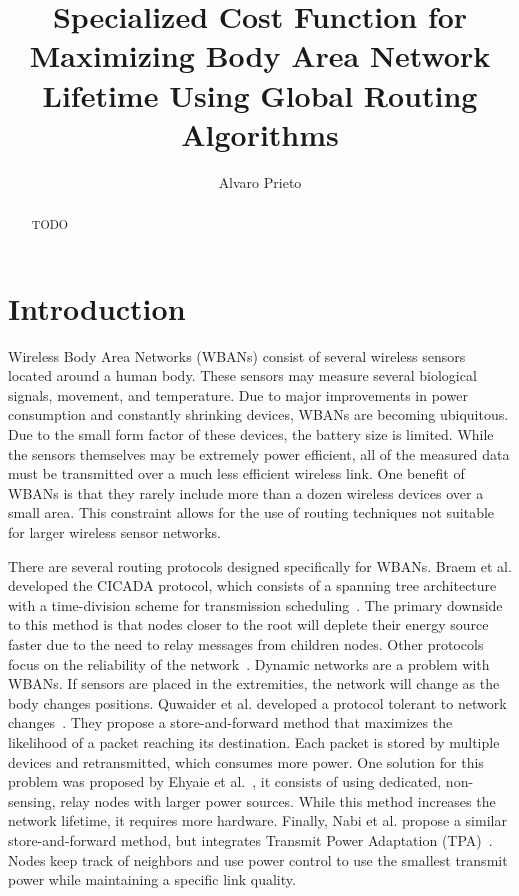\documentclass{article}
\begin{document}
\title{Specialized Cost Function for Maximizing Body Area Network Lifetime Using Global Routing Algorithms}
\author{Alvaro Prieto}
\maketitle

\begin{abstract}
TODO
\end{abstract}

\section{Introduction}
Wireless Body Area Networks (WBANs) consist of several wireless sensors located around a human body. These sensors may measure several biological signals, movement, and temperature. Due to major improvements in power consumption and constantly shrinking devices, WBANs are becoming ubiquitous. Due to the small form factor of these devices, the battery size is limited. While the sensors themselves may be extremely power efficient, all of the measured data must be transmitted over a much less efficient wireless link. One benefit of WBANs is that they rarely include more than a dozen wireless devices over a small area. This constraint allows for the use of routing techniques not suitable for larger wireless sensor networks.

There are several routing protocols designed specifically for WBANs. Braem et al. developed the CICADA protocol, which consists of a spanning tree architecture with a time-division scheme for transmission scheduling~\cite{protocol:CICADA}. The primary downside to this method is that nodes closer to the root will deplete their energy source faster due to the need to relay messages from children nodes. Other protocols focus on the reliability of the network~\cite{routing:storeandforward}. Dynamic networks are a problem with WBANs. If sensors are placed in the extremities, the network will change as the body changes positions. Quwaider et al. developed a protocol tolerant to network changes~\cite{routing:storeandforward}. They propose a store-and-forward method that maximizes the likelihood of a packet reaching its destination. Each packet is stored by multiple devices and retransmitted, which consumes more power. One solution for this problem was proposed by Ehyaie et al.~\cite{relay:networklife}, it consists of using dedicated, non-sensing, relay nodes with larger power sources. While this method increases the network lifetime, it requires more hardware. Finally, Nabi et al. propose a similar store-and-forward method, but integrates Transmit Power Adaptation (TPA)~\cite{relay:transmitpoweradaptation}. Nodes keep track of neighbors and use power control to use the smallest transmit power while maintaining a specific link quality.
\end{document}

